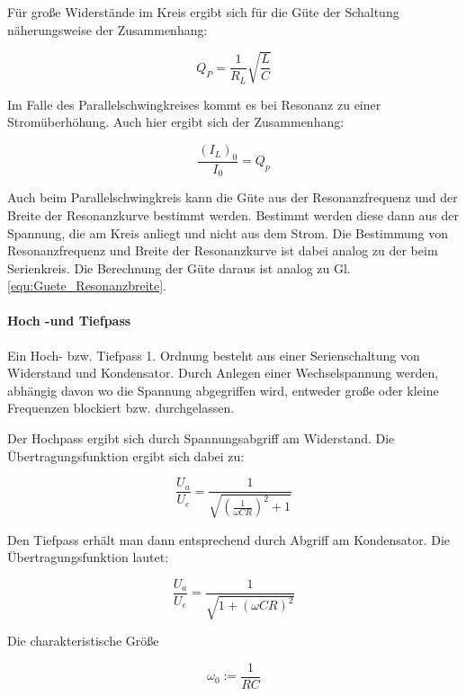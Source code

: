 \documentclass[12pt,a4paper]{article}
\begin{document}
Für große Widerstände im Kreis ergibt sich für die Güte der Schaltung näherungsweise der Zusammenhang:

\begin{equation}
Q_P = \frac{1}{R_L} \sqrt{\frac{L}{C}}
\label{equ:Güte_Bauteile}
\end{equation}

Im Falle des Parallelschwingkreises kommt es bei Resonanz zu einer Stromüberhöhung. Auch hier ergibt sich der Zusammenhang:

\begin{equation}
\frac{(I_L)_0}{I_0} = Q_p
\label{eq:Parallel_Strmhoch}
\end{equation}

Auch beim Parallelschwingkreis kann die Güte aus der Resonanzfrequenz und der Breite der Resonanzkurve bestimmt werden. Bestimmt werden diese dann aus der Spannung, die am Kreis anliegt und nicht aus dem Strom. Die Bestimmung von Resonanzfrequenz und Breite der Resonanzkurve ist dabei analog zu der beim Serienkreis. Die Berechnung der Güte daraus ist analog zu Gl. \ref{equ:Guete_Resonanzbreite}.


\paragraph{Hoch -und Tiefpass}
Ein Hoch- bzw. Tiefpass 1. Ordnung besteht aus einer Serienschaltung von Widerstand und Kondensator. Durch Anlegen einer Wechselspannung werden, abhängig davon wo die Spannung abgegriffen wird, entweder große oder kleine Frequenzen blockiert bzw. durchgelassen.

Der Hochpass ergibt sich durch Spannungsabgriff am Widerstand. Die Übertragungsfunktion ergibt sich dabei zu:

\begin{equation}
\frac{U_a}{U_e} = \frac{1}{\sqrt{(\frac{1}{\omega C R})^2+1}}
\label{eq:Hochpass}
\end{equation}

Den Tiefpass erhält man dann entsprechend durch Abgriff am Kondensator. Die Übertragungsfunktion lautet:

\begin{equation}
\frac{U_a}{U_e} = \frac{1}{\sqrt{1+(\omega C R)^2}}
\label{eq:Tiefpass}
\end{equation}

Die charakteristische Größe 

\begin{equation}
\omega_0 := \frac{1}{RC}
\label{eq:FreqHochTief}
\end{equation} 
\end{document}
